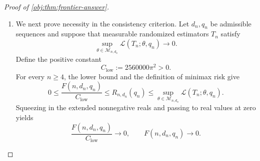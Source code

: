 \begin{proof}[Proof of \cref{obj:thm:frontier-answer}]
\begin{enumerate}
The baseline density in \cref{obj:def:block-prior} vanishes outside
\([-1/4,1/4]\), so \(|U_\ell|\le1/4\) almost surely for every block. For either
\(\sigma\in\{-1,1\}\), each recipient \(i\in C_\ell\) consequently satisfies
\[
|a_i|+|t_i|+\sum_{j:(j,i)\in G}|b_{ij}|
=
\left|U_\ell-\frac{\sigma h}{2}\right|
+d\frac hd
\le\frac14+\frac{3h}{2}
\le1.
\]
Source and padding rows have coefficient mass zero. Thus both priors are supported on \(\mathcal M_{n,d}\). Summing the spillover contributions by source gives their constant targets:
\[
\tau(\theta)
=\frac1n\sum_{j=1}^{m}\sum_{i:(j,i)\in G}\frac{\sigma h}{d}
=\frac1n\sum_{j=1}^{m}\sigma h
=\frac{\sigma mh}{n}
=\sigma\Delta.
\]

The record maps are jointly measurable: their graph and assignment coordinates are finite, and their outcome coordinates are affine in the baselines. The canonical product design and \(2Bd\le n\) satisfy the hypotheses of \cref{obj:thm:block-testing-scale}, which supplies
\[
\operatorname{TV}(P_{+1,h},P_{-1,h})\le\frac12.
\]
Applying \cref{obj:lem:full-record-two-prior-risk} to these supported priors yields
\[
R_{n,d}(q)
\ge
\frac{\Delta^2}{2}
\left(1-\operatorname{TV}(P_{+1,h},P_{-1,h})\right)
\ge
\frac{\Delta^2}{4}
=
\frac14\left(\frac{m\kappa s}{n}\right)^2.
\]
This bound applies to the full class of measurable randomized estimators in
\cref{obj:def:risk}.

Finally, \(m/n\ge1/4\) gives
\[
\frac{\kappa s}{4}\le\frac{m\kappa s}{n},
\qquad
\frac14\left(\frac{\kappa s}{4}\right)^2
=\frac{s^2}{640000\pi^2}.
\]
Combining the preceding inequalities,
\[
\frac{F(n,d,q)}{2560000\pi^2}
\le
\frac{s^2}{2560000\pi^2}
\le
\frac{s^2}{640000\pi^2}
\le
\frac14\left(\frac{m\kappa s}{n}\right)^2
\le R_{n,d}(q).
\]
Together with the large-degree case and the upper bound, this proves the displayed risk chain.

\item We next prove necessity in the consistency criterion. Let \(d_n,q_n\) be admissible sequences and suppose that measurable randomized estimators \(T_n\) satisfy
\[
\sup_{\theta\in\mathcal M_{n,d_n}}
\mathcal L(T_n;\theta,q_n)\longrightarrow0.
\]
Define the positive constant
\[
C_{\mathrm{low}}:=2560000\pi^2>0.
\]
For every \(n\ge4\), the lower bound and the definition of minimax risk give
\[
0\le
\frac{F(n,d_n,q_n)}{C_{\mathrm{low}}}
\le R_{n,d_n}(q_n)
\le
\sup_{\theta\in\mathcal M_{n,d_n}}
\mathcal L(T_n;\theta,q_n).
\]
Squeezing in the extended nonnegative reals and passing to real values at zero yields
\[
\frac{F(n,d_n,q_n)}{C_{\mathrm{low}}}\longrightarrow0,
\qquad
F(n,d_n,q_n)\longrightarrow0.
\]


\end{enumerate}
\end{proof}
